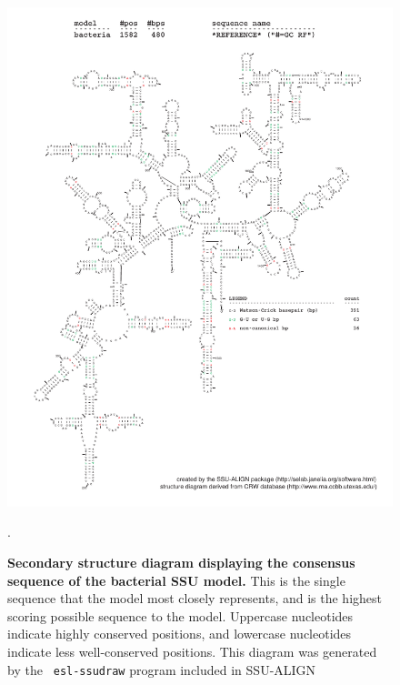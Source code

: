 \begin{figure}
\begin{center}
\includegraphics[width=5.7in]{Figures/bacteria-0p1-rf}
\end{center}
\caption[Secondary structure diagram displaying the consensus sequence
  of the bacterial SSU model]{\textbf{Secondary structure diagram displaying the
  consensus sequence of the bacterial SSU model.} 
  This is the single sequence that the model 
  most closely represents, and is the highest scoring possible
  sequence to the model. Uppercase nucleotides indicate highly conserved positions,
  and lowercase nucleotides indicate less well-conserved positions.
  This diagram was generated by the {\tt
  esl-ssudraw} program included in SSU-ALIGN}.
\label{fig:bacrf}
\end{figure}

